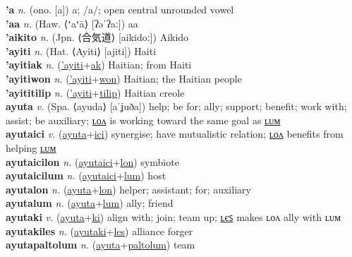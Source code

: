 \textbf{'a} \textit{n.} (ono. [a])
a; /a/; open central unrounded vowel \label{'a} \\
\textbf{'aa} \textit{n.} (Haw. ⟨ʻaʻā⟩ [ʔəˈʔaː])
aa \label{'aa} \\
\textbf{'aikito} \textit{n.} (Jpn. ⟨合気道⟩ [aikidoː])
Aikido \label{'aikito} \\
\textbf{'ayiti} \textit{n.} (Hat. ⟨Ayiti⟩ [ajiti])
Haiti \label{'ayiti} \\
\textbf{'ayitiak} \textit{n.} (\hyperref['ayiti]{'ayiti}+\hyperref[ak]{ak})
Haitian; from Haiti \label{'ayitiak} \\
\textbf{'ayitiwon} \textit{n.} (\hyperref['ayiti]{'ayiti}+\hyperref[won]{won})
Haitian; the Haitian people \label{'ayitiwon} \\
\textbf{'ayititilip} \textit{n.} (\hyperref['ayiti]{'ayiti}+\hyperref[tilip]{tilip})
Haitian creole \label{'ayititilip} \\
\textbf{ayuta} \textit{v.} (Spa. ⟨ayuda⟩ [aˈʝuða])
help; be for; ally; support; benefit; work with; assist; be auxiliary; \hyperref[ayutalon]{ʟᴏᴧ} is working toward the same goal as \hyperref[ayutalum]{ʟᴜᴍ} \label{ayuta} \\
\textbf{ayutaici} \textit{v.} (\hyperref[ayuta]{ayuta}+\hyperref[ici]{ici})
synergise; have mutualistic relation; \hyperref[ayutaicilon]{ʟᴏᴧ} benefits from helping \hyperref[ayutaicilum]{ʟᴜᴍ} \label{ayutaici} \\
\textbf{ayutaicilon} \textit{n.} (\hyperref[ayutaici]{ayutaici}+\hyperref[lon]{lon})
symbiote \label{ayutaicilon} \\
\textbf{ayutaicilum} \textit{n.} (\hyperref[ayutaici]{ayutaici}+\hyperref[lum]{lum})
host \label{ayutaicilum} \\
\textbf{ayutalon} \textit{n.} (\hyperref[ayuta]{ayuta}+\hyperref[lon]{lon})
helper; assistant; for; auxiliary \label{ayutalon} \\
\textbf{ayutalum} \textit{n.} (\hyperref[ayuta]{ayuta}+\hyperref[lum]{lum})
ally; friend \label{ayutalum} \\
\textbf{ayutaki} \textit{v.} (\hyperref[ayuta]{ayuta}+\hyperref[ki]{ki})
align with; join; team up; \hyperref[ayutakiles]{ʟєꜱ} makes ʟᴏᴧ ally with ʟᴜᴍ \label{ayutaki} \\
\textbf{ayutakiles} \textit{n.} (\hyperref[ayutaki]{ayutaki}+\hyperref[les]{les})
alliance forger \label{ayutakiles} \\
\textbf{ayutapaltolum} \textit{n.} (\hyperref[ayuta]{ayuta}+\hyperref[paltolum]{paltolum})
team \label{ayutapaltolum} \\
